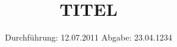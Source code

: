 

\subject{VERSUCH NUMMER}
\title{TITEL}
\date{
\centering
  Durchführung: 12.07.2011
  \hspace{3em}
  Abgabe: 23.04.1234
}



\maketitle
\thispagestyle{empty}
\tableofcontents
\newpage








\printbibliography


